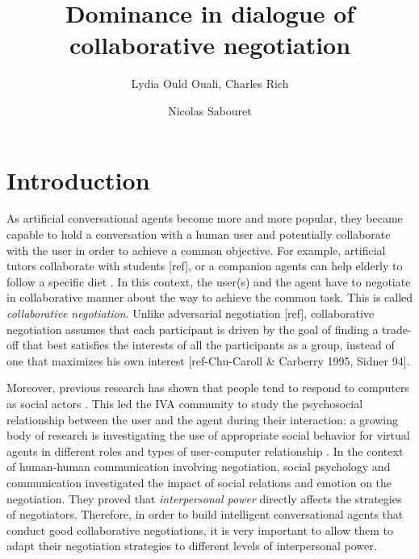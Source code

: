 \documentclass{llncs}
\begin{document}
	\title{\vskip -10pt Dominance in dialogue of collaborative negotiation}
	
	\author{Lydia Ould Ouali, Charles Rich \and
		Nicolas Sabouret }
	

	\maketitle
	\section{Introduction}
	
	
	\par As artificial conversational agents become more and more popular, they became capable to hold a conversation with a human user and potentially collaborate with the user in order to achieve a common objective. For example, artificial tutors collaborate with students [ref], or a companion agents can help elderly to follow a specific diet \cite{kidd2005sociable}. In this context, the user(s) and the agent have to negotiate in collaborative manner about the way to achieve the common task. This is called \emph{collaborative negotiation}. Unlike adversarial negotiation [ref], collaborative negotiation assumes that each participant is driven by the goal of finding a trade-off that best satisfies the interests of all the participants as a group, instead of one that maximizes his own interest [ref-Chu-Caroll & Carberry 1995, Sidner 94].
	
	Moreover, previous research has shown that people tend to respond to computers as social actors \cite{bickmore2005establishing}. This led the IVA community to study the psychosocial relationship between the user and the agent during their interaction: a growing body of research is investigating the use of appropriate social behavior for virtual agents in different roles and types of user-computer relationship \cite{bickmore2005s,bickmore2005establishing,kidd2005sociable}. In the context of human-human communication involving negotiation, social psychology and communication \cite{dunbar2005perceptions,de1995impact} investigated the impact of social relations and emotion on the negotiation. They proved that  \emph{interpersonal power} directly affects the strategies of negotiators. Therefore, in order to build intelligent conversational agents that conduct good collaborative negotiations, it is very important to allow them to adapt their negotiation strategies to different levels of interpersonal power.
	
\end{document}
